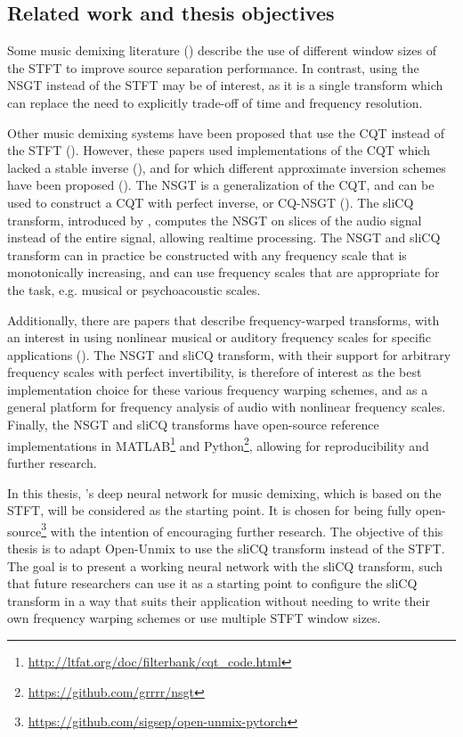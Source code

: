 \documentclass[report.tex]{subfiles}
\begin{document}
\subsection{Related work and thesis objectives}

Some music demixing literature (\cite{fitzgerald1, driedger, tftradeoff1, tftradeoff2}) describe the use of different window sizes of the STFT to improve source separation performance. In contrast, using the NSGT instead of the STFT may be of interest, as it is a single transform which can replace the need to explicitly trade-off of time and frequency resolution.

Other music demixing systems have been proposed that use the CQT instead of the STFT (\cite{fitzgerald2, cqtseparation, bettermusicsep}). However, these papers used implementations of the CQT which lacked a stable inverse (\cite{lackinverse}), and for which different approximate inversion schemes have been proposed (\cite{klapuricqt, fitzgeraldcqt}). The NSGT is a generalization of the CQT, and can be used to construct a CQT with perfect inverse, or CQ-NSGT (\cite{invertiblecqt, variableq1}). The sliCQ transform, introduced by \textcite{slicq}, computes the NSGT on slices of the audio signal instead of the entire signal, allowing realtime processing. The NSGT and sliCQ transform can in practice be constructed with any frequency scale that is monotonically increasing, and can use frequency scales that are appropriate for the task, e.g. musical or psychoacoustic scales.

Additionally, there are papers that describe frequency-warped transforms, with an interest in using nonlinear musical or auditory frequency scales for specific applications (\cite{warped1, warped2, earlywarped1, earlywarped2, warpedcomparison, warpedpsycho}). The NSGT and sliCQ transform, with their support for arbitrary frequency scales with perfect invertibility, is therefore of interest as the best implementation choice for these various frequency warping schemes, and as a general platform for frequency analysis of audio with nonlinear frequency scales. Finally, the NSGT and sliCQ transforms have open-source reference implementations in MATLAB\footnote{\url{http://ltfat.org/doc/filterbank/cqt_code.html}} and Python\footnote{\url{https://github.com/grrrr/nsgt}}, allowing for reproducibility and further research.

In this thesis, \textcite{umx}'s deep neural network for music demixing, which is based on the STFT, will be considered as the starting point. It is chosen for being fully open-source\footnote{\url{https://github.com/sigsep/open-unmix-pytorch}} with the intention of encouraging further research. The objective of this thesis is to adapt Open-Unmix to use the sliCQ transform instead of the STFT. The goal is to present a working neural network with the sliCQ transform, such that future researchers can use it as a starting point to configure the sliCQ transform in a way that suits their application without needing to write their own frequency warping schemes or use multiple STFT window sizes.
\end{document}
